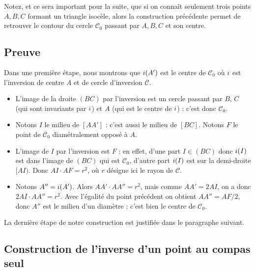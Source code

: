 \documentclass[11pt,class=report,crop=false]{standalone}
\begin{document}
\begin{remarque*}
Notez, et ce sera important pour la suite, que si on connaît seulement trois points $A,B,C$
formant un triangle isocèle, alors la construction précédente permet de retrouver le contour du cercle $\mathcal{C}_0$ 
passant par $A,B,C$ et son centre.
\end{remarque*}

\subsection{Preuve}

Dans une première étape, nous montrons que $i(A')$ est le centre
de $\mathcal{C}_0$ où $i$ est l'inversion de centre $A$ et de cercle d'inversion
$\mathcal{C}$.

\begin{itemize}
 \item L'image de la droite $(BC)$ par l'inversion est un cercle passant par $B$, $C$ (qui sont invariants par $i$) et $A$ (qui est le centre de $i$) : c'est donc $\mathcal{C}_0$.
 
 \item Notons $I$ le milieu de $[AA']$ : c'est aussi le milieu de $[BC]$.
 Notons $F$ le point de $\mathcal{C}_0$ diamétralement opposé à $A$.
 
 \item L'image de $I$ par l'inversion est $F$ : en effet, d'une part $I \in (BC)$ donc
 $i(I)$ est dans l'image de $(BC)$ qui est $\mathcal{C}_0$, d'autre part $i(I)$ est sur la demi-droite $[AI)$. 
 Donc $AI \cdot AF = r^2$,
 où $r$ désigne ici le rayon de $\mathcal{C}$.
 
 \item Notons $A''=i(A')$. Alors $AA' \cdot AA''= r^2$, mais comme $AA' = 2 AI$, on a 
 donc $2 AI\cdot AA''= r^2$. Avec l'égalité du point précédent on obtient $AA'' = AF/2$, donc $A''$ est le milieu d'un diamètre : c'est bien le centre de $\mathcal{C}_0$.
\end{itemize}

La dernière étape de notre construction est justifiée dans le paragraphe suivant.

\subsection{Construction de l'inverse d'un point au compas seul}
\end{document}
